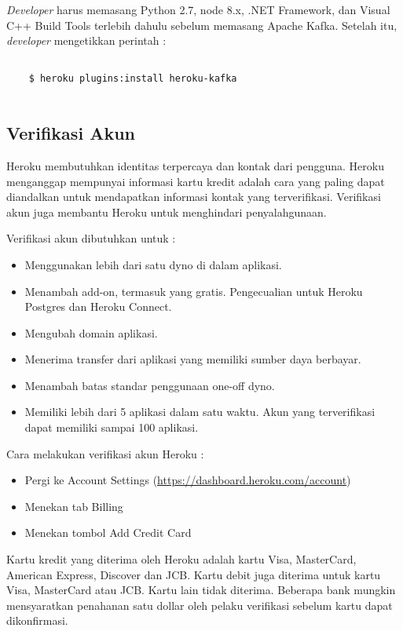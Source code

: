 \textit{Developer} harus memasang Python 2.7, node 8.x, .NET Framework, dan Visual C++ Build Tools terlebih dahulu sebelum memasang Apache Kafka. Setelah itu, \textit{developer} mengetikkan perintah :
\begin{lstlisting}
	
	$ heroku plugins:install heroku-kafka
	
\end{lstlisting}

\subsection{Verifikasi Akun}
Heroku membutuhkan identitas terpercaya dan kontak dari pengguna. Heroku menganggap mempunyai informasi kartu kredit adalah cara yang paling dapat diandalkan untuk mendapatkan informasi kontak yang terverifikasi. Verifikasi akun juga membantu Heroku untuk menghindari penyalahgunaan.

Verifikasi akun dibutuhkan untuk :
\begin{itemize}
\item Menggunakan lebih dari satu dyno di dalam aplikasi.
\item Menambah add-on, termasuk yang gratis. Pengecualian untuk Heroku Postgres dan Heroku Connect.
\item Mengubah domain aplikasi.
\item Menerima transfer dari aplikasi yang memiliki sumber daya berbayar.
\item Menambah batas standar penggunaan one-off dyno.
\item Memiliki lebih dari 5 aplikasi dalam satu waktu.  Akun yang terverifikasi dapat memiliki sampai 100 aplikasi.
\end{itemize}

Cara melakukan verifikasi akun Heroku :
\begin{itemize}
\item Pergi ke Account Settings (\url{https://dashboard.heroku.com/account})
\item Menekan tab Billing
\item Menekan tombol Add Credit Card
\end{itemize}

Kartu kredit yang diterima oleh Heroku adalah kartu Visa, MasterCard, American Express, Discover dan JCB. Kartu debit juga diterima untuk kartu Visa, MasterCard atau JCB. Kartu lain tidak diterima. Beberapa bank mungkin mensyaratkan penahanan satu dollar oleh pelaku verifikasi sebelum kartu dapat dikonfirmasi.

